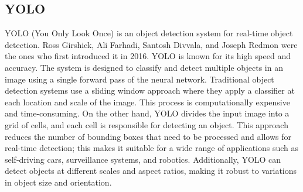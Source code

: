 \subsection{YOLO}
YOLO (You Only Look Once) is an object detection system for real-time object detection. Ross Girshick, Ali Farhadi, Santosh Divvala, and Joseph Redmon were the ones who first introduced it in 2016. YOLO is known for its high speed and accuracy. The system is designed to classify and detect multiple objects in an image using a single forward pass of the neural network.
Traditional object detection systems use a sliding window approach where they apply a classifier at each location and scale of the image. This process is computationally expensive and time-consuming. On the other hand, YOLO divides the input image into a grid of cells, and each cell is responsible for detecting an object. This approach reduces the number of bounding boxes that need to be processed and allows for real-time detection; this makes it suitable for a wide range of applications such as self-driving cars, surveillance systems, and robotics. Additionally, YOLO can detect objects at different scales and aspect ratios, making it robust to variations in object size and orientation. \cite{terven2023comprehensive} \cite{redmon2016you} 

